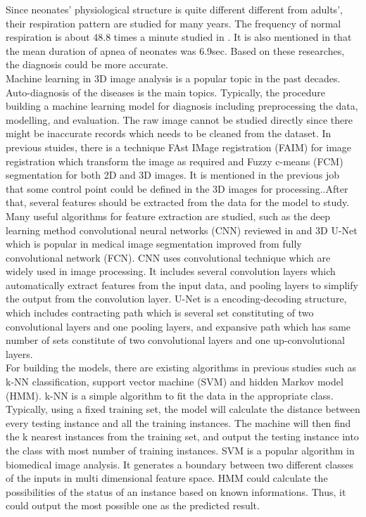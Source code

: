\documentclass[ a4paper, 12pt, oneside ]{article} %
\begin{document}
Since neonates' physiological structure is quite different different from adults', their respiration pattern are studied for many years. The frequency of normal respiration is about 48.8 times a minute studied in \cite{Mathew1985}. It is also mentioned in \cite{Fenner1973} that the mean duration of apnea of neonates was 6.9sec. Based on these researches, the diagnosis could be more accurate.\\
Machine learning in 3D image analysis is a popular topic in the past decades. Auto-diagnosis of the diseases is the main topics. Typically, the procedure building a machine learning model for diagnosis including preprocessing the data, modelling, and evaluation. The raw image cannot be studied directly since there might be inaccurate records which needs to be cleaned from the dataset. In previous stuides, there is a technique FAst IMage registration (FAIM)\cite{Kuang2019} for image registration which transform the image as required and Fuzzy c-means (FCM) segmentation for both 2D and 3D images. It is mentioned in the previous job that some control point could be defined in the 3D images for processing.\cite{Shadi}.After that, several features should be extracted from the data for the model to study.\\
Many useful algorithms for feature extraction are studied, such as the deep learning method convolutional neural networks (CNN) reviewed in \cite{singh20203d} and 3D U-Net \cite{Ronneberger2015}\cite{UNet2016} which is popular in medical image segmentation improved from fully convolutional network (FCN)\cite{long2015fully}. CNN uses convolutional technique which are widely used in image processing. It includes several convolution layers which automatically extract features from the input data, and pooling layers to simplify the output from the convolution layer. U-Net is a encoding-decoding structure, which includes contracting path which is several set constituting of two convolutional layers and one pooling layers, and  expansive path which has same number of sets constitute of two convolutional layers and one up-convolutional layers.  \\ 
For building the models, there are existing algorithms in previous studies such as k-NN classification, support vector machine (SVM) \cite{ozdemir2016time}and hidden Markov model (HMM)\cite{song2015obstructive}. k-NN is a simple algorithm to fit the data in the appropriate class. Typically, using a fixed training set, the model will calculate the distance between every testing instance and all the training instances. The machine will then find the k nearest instances from the training set, and output the testing instance into the class with most number of training instances. SVM is a popular algorithm in biomedical image analysis. It generates a boundary between two different classes of the inputs in multi dimensional feature space. HMM could calculate the possibilities of the status of an instance based on known informations. Thus, it could output the most possible one as the predicted result.\\
\end{document}

